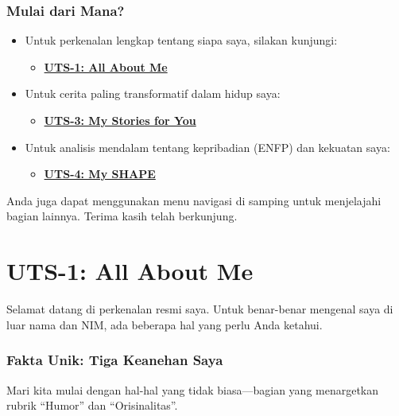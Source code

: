 \documentclass[
  letterpaper,
  DIV=11,
  numbers=noendperiod]{scrreprt}
\providecommand{\tightlist}{%
  \setlength{\itemsep}{0pt}\setlength{\parskip}{0pt}}
\begin{document}
\subsection*{Mulai dari Mana?}\label{mulai-dari-mana}

\begin{itemize}
\tightlist
\item
  Untuk perkenalan lengkap tentang siapa saya, silakan kunjungi:

  \begin{itemize}
  \tightlist
  \item
    \textbf{\href{./All_About_me/index.qmd}{UTS-1: All About Me}}
  \end{itemize}
\item
  Untuk cerita paling transformatif dalam hidup saya:

  \begin{itemize}
  \tightlist
  \item
    \textbf{\href{./My_Stories_for_You/index.qmd}{UTS-3: My Stories for
    You}}
  \end{itemize}
\item
  Untuk analisis mendalam tentang kepribadian (ENFP) dan kekuatan saya:

  \begin{itemize}
  \tightlist
  \item
    \textbf{\href{./My_Shapes/index.qmd}{UTS-4: My SHAPE}}
  \end{itemize}
\end{itemize}

Anda juga dapat menggunakan menu navigasi di samping untuk menjelajahi
bagian lainnya. Terima kasih telah berkunjung.


\chapter{UTS-1: All About Me}\label{uts-1-all-about-me}

Selamat datang di perkenalan resmi saya. Untuk benar-benar mengenal saya
di luar nama dan NIM, ada beberapa hal yang perlu Anda ketahui.

\subsection{Fakta Unik: Tiga Keanehan
Saya}\label{fakta-unik-tiga-keanehan-saya}

Mari kita mulai dengan hal-hal yang tidak biasa---bagian yang
menargetkan rubrik ``Humor'' dan ``Orisinalitas''.
\end{document}
